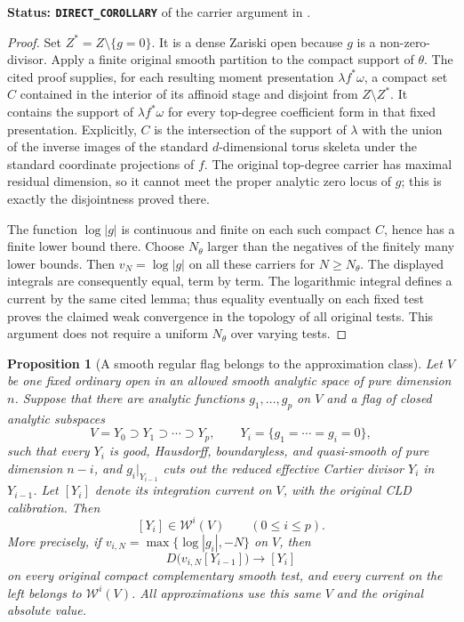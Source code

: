 \documentclass[11pt,a4paper]{article}
\numberwithin{equation}{section}
\newtheorem{proposition}[theorem]{Proposition}
\theoremstyle{definition}
\theoremstyle{remark}
\begin{document}
\noindent\textbf{Status: \texttt{DIRECT\_COROLLARY}} of the
carrier argument in \cite[Lemma 4.6.1 and its proof, printed
pp.~72--73]{CLD12}.

\begin{proof}
Set $Z^*=Z\setminus\{g=0\}$.  It is a dense Zariski open because
$g$ is a non-zero-divisor.  Apply a finite original smooth partition
to the compact support of $\theta$.  The cited proof supplies, for
each resulting moment presentation $\lambda f^*\omega$, a compact
set $C$ contained in the interior of its affinoid stage and disjoint
from $Z\setminus Z^*$.  It contains the support of
$\lambda f^*\omega$ for every top-degree coefficient form in that
fixed presentation.  Explicitly, $C$ is the intersection of the
support of $\lambda$ with the union of the inverse images of the
standard $d$-dimensional torus skeleta under the standard coordinate
projections of $f$.  The original top-degree carrier has maximal
residual dimension, so it cannot meet the proper analytic zero
locus of $g$; this is exactly the disjointness proved there.

The function $\log|g|$ is continuous and finite on each such compact
$C$, hence has a finite lower bound there.  Choose $N_\theta$ larger
than the negatives of the finitely many lower bounds.  Then
$v_N=\log|g|$ on all these carriers for $N\geq N_\theta$.
The displayed integrals are consequently equal, term by term.
The logarithmic integral defines a current by the same cited lemma;
thus equality eventually on each fixed test proves the claimed
weak convergence in the topology of all original tests.  This
argument does not require a uniform $N_\theta$ over varying tests.
\end{proof}

\begin{proposition}[A smooth regular flag belongs to the approximation class]
\label{prop:r6-smooth-flag-delta-closure}
Let $V$ be one fixed ordinary open in an allowed smooth analytic
space of pure dimension $n$.  Suppose that there are analytic
functions $g_1,\ldots,g_p$ on $V$ and a flag of closed analytic
subspaces
\[
       V=Y_0\supset Y_1\supset\cdots\supset Y_p,
       \qquad
       Y_i=\{g_1=\cdots=g_i=0\},
\]
such that every $Y_i$ is good, Hausdorff, boundaryless, and
quasi-smooth of pure dimension $n-i$, and $g_i|_{Y_{i-1}}$ cuts
out the reduced effective Cartier divisor $Y_i$ in $Y_{i-1}$.
Let $[Y_i]$ denote its integration current on $V$, with the
original CLD calibration.  Then
\[
                       [Y_i]\in\mathcal W^i(V)
                       \qquad(0\leq i\leq p).
\]
More precisely, if $v_{i,N}=\max\{\log|g_i|,-N\}$ on $V$, then
\[
          D\bigl(v_{i,N}[Y_{i-1}]\bigr)
                   \longrightarrow [Y_i]
\]
on every original compact complementary smooth test, and every
current on the left belongs to $\mathcal W^i(V)$.
All approximations use this same $V$ and the original absolute value.
\end{proposition}
\end{document}

